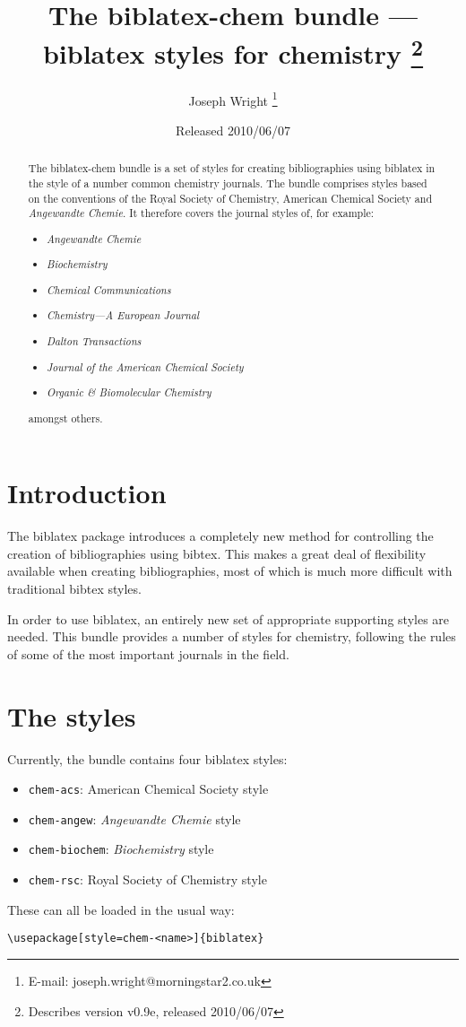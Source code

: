 \documentclass[a4paper]{article}
\title{The \textsf{biblatex-chem} bundle --- 
  \textsf{biblatex} styles for chemistry%
  \thanks{Describes version v0.9e, released 2010/06/07}}
\author{Joseph Wright%
  \thanks{E-mail: joseph.wright@morningstar2.co.uk}}
\date{Released 2010/06/07}
\begin{document}
\maketitle
\begin{abstract}
The \textsf{biblatex-chem} bundle is a set of styles for 
creating bibliographies using \textsf{biblatex} in the style of
a number common chemistry journals.  The bundle comprises styles
based on the conventions of the Royal Society of Chemistry, 
American Chemical Society and 	\emph{Angewandte Chemie}. It
therefore covers the journal styles of, for example:
\begin{itemize}
  \item \emph{Angewandte Chemie}
  \item \emph{Biochemistry}
  \item \emph{Chemical Communications}
  \item \emph{Chemistry---A European Journal}
  \item \emph{Dalton Transactions}
  \item \emph{Journal of the American Chemical Society}
  \item \emph{Organic \& Biomolecular Chemistry}
\end{itemize}
amongst others.
\end{abstract}

\begin{multicols}{2}
  \tableofcontents
\end{multicols}

\section{Introduction}
The \textsf{biblatex} package introduces a completely new method
for controlling the creation of bibliographies using
\textsf{bibtex}. This makes a great deal of flexibility 
available when creating bibliographies, most of which is much 
more difficult with traditional \textsf{bibtex} styles.

In order to use \textsf{biblatex}, an entirely new set of 
appropriate supporting styles are needed. This bundle provides a
number of styles for chemistry, following the rules of some of 
the most important journals in the field. 

\section{The styles}

Currently, the bundle contains four \textsf{biblatex} styles:
\begin{itemize}
  \item \texttt{chem-acs}: American Chemical Society style
  \item \texttt{chem-angew}: \emph{Angewandte Chemie} style
  \item \texttt{chem-biochem}: \emph{Biochemistry} style
  \item \texttt{chem-rsc}: Royal Society of Chemistry style
\end{itemize}
These can all be loaded in the usual way:
\begin{verbatim}
\usepackage[style=chem-<name>]{biblatex}
\end{verbatim}
\end{document}

